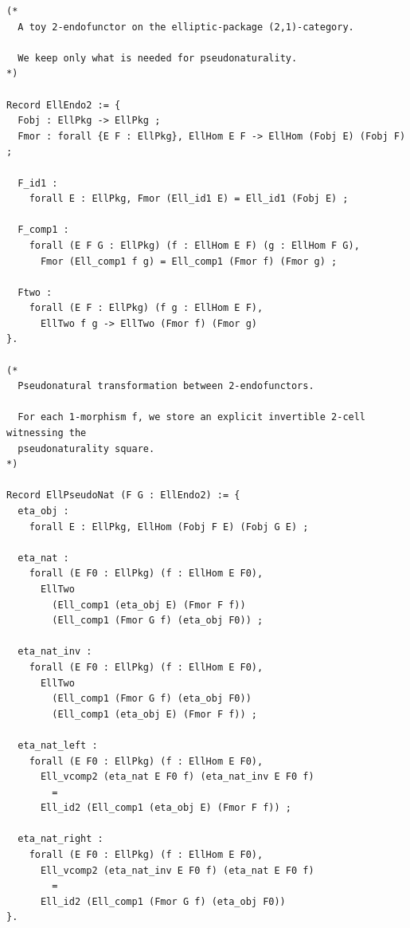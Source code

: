 \documentclass[10pt, reqno]{amsart}
\theoremstyle{plain}
\theoremstyle{definition}
\theoremstyle{plain}
\begin{document}
\begin{scriptsize}
\begin{verbatim}
(*
  A toy 2-endofunctor on the elliptic-package (2,1)-category.

  We keep only what is needed for pseudonaturality.
*)

Record EllEndo2 := {
  Fobj : EllPkg -> EllPkg ;
  Fmor : forall {E F : EllPkg}, EllHom E F -> EllHom (Fobj E) (Fobj F) ;

  F_id1 :
    forall E : EllPkg, Fmor (Ell_id1 E) = Ell_id1 (Fobj E) ;

  F_comp1 :
    forall (E F G : EllPkg) (f : EllHom E F) (g : EllHom F G),
      Fmor (Ell_comp1 f g) = Ell_comp1 (Fmor f) (Fmor g) ;

  Ftwo :
    forall (E F : EllPkg) (f g : EllHom E F),
      EllTwo f g -> EllTwo (Fmor f) (Fmor g)
}.

(*
  Pseudonatural transformation between 2-endofunctors.

  For each 1-morphism f, we store an explicit invertible 2-cell witnessing the
  pseudonaturality square.
*)

Record EllPseudoNat (F G : EllEndo2) := {
  eta_obj :
    forall E : EllPkg, EllHom (Fobj F E) (Fobj G E) ;

  eta_nat :
    forall (E F0 : EllPkg) (f : EllHom E F0),
      EllTwo
        (Ell_comp1 (eta_obj E) (Fmor F f))
        (Ell_comp1 (Fmor G f) (eta_obj F0)) ;

  eta_nat_inv :
    forall (E F0 : EllPkg) (f : EllHom E F0),
      EllTwo
        (Ell_comp1 (Fmor G f) (eta_obj F0))
        (Ell_comp1 (eta_obj E) (Fmor F f)) ;

  eta_nat_left :
    forall (E F0 : EllPkg) (f : EllHom E F0),
      Ell_vcomp2 (eta_nat E F0 f) (eta_nat_inv E F0 f)
        =
      Ell_id2 (Ell_comp1 (eta_obj E) (Fmor F f)) ;

  eta_nat_right :
    forall (E F0 : EllPkg) (f : EllHom E F0),
      Ell_vcomp2 (eta_nat_inv E F0 f) (eta_nat E F0 f)
        =
      Ell_id2 (Ell_comp1 (Fmor G f) (eta_obj F0))
}.
\end{verbatim}
\end{scriptsize}
\end{document}
